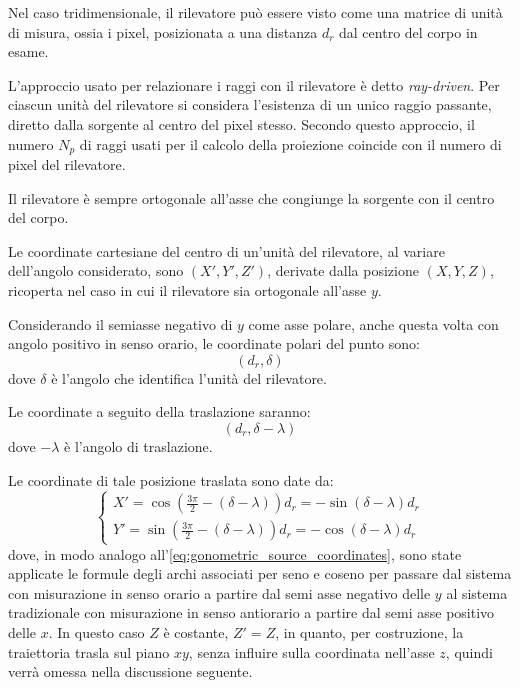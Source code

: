\documentclass[12pt,a4paper]{report}
\begin{document}
Nel caso tridimensionale, il rilevatore può essere visto come una matrice di unità di misura, ossia i pixel, posizionata a una
distanza \(d_r\) dal centro del corpo in esame.

L'approccio usato per relazionare i raggi con il rilevatore è detto \textit{ray-driven}.
Per ciascun unità del rilevatore si considera l'esistenza di un unico raggio passante, diretto dalla sorgente al centro del
pixel stesso.
Secondo questo approccio, il numero \(N_p\) di raggi usati per il calcolo della proiezione coincide con il numero di pixel del
rilevatore.

Il rilevatore è sempre ortogonale all'asse che congiunge la sorgente con il centro del corpo.

Le coordinate cartesiane del centro di un'unità del rilevatore, al variare dell'angolo considerato, sono \((X', Y', Z')\),
derivate dalla posizione \((X, Y, Z)\), ricoperta nel caso in cui il rilevatore sia ortogonale all'asse \(y\).

Considerando il semiasse negativo di \(y\) come asse polare, anche questa volta con angolo positivo in senso orario, le
coordinate polari del punto sono:
\begin{equation*} %
  (d_r, \delta)
\end{equation*}
dove \(\delta\) è l'angolo che identifica l'unità del rilevatore.

Le coordinate a seguito della traslazione saranno:
\begin{equation*}
  (d_r, \delta - \lambda)
\end{equation*}
dove \(-\lambda\) è l'angolo di traslazione.

Le coordinate di tale posizione traslata sono date da:
\begin{equation} \label{eq:goniometric_detector_coordinates}
  \begin{cases}
    X' = \cos(\frac{3\pi}{2} - (\delta - \lambda)) d_r = -\sin(\delta - \lambda) d_r \\
    Y' = \sin(\frac{3\pi}{2} - (\delta - \lambda)) d_r = -\cos(\delta - \lambda) d_r
  \end{cases}
\end{equation}
dove, in modo analogo all'\autoref{eq:gonometric_source_coordinates}, sono state applicate le formule degli archi associati per
seno e coseno per passare dal sistema con misurazione in senso orario a partire dal semi asse negativo delle \(y\) al sistema
tradizionale con misurazione in senso antiorario a partire dal semi asse positivo delle \(x\).
In questo caso \(Z\) è costante, \(Z' = Z\), in quanto, per costruzione, la traiettoria trasla sul piano \(xy\), senza influire
sulla coordinata nell'asse \(z\), quindi verrà omessa nella discussione seguente.
\end{document}
